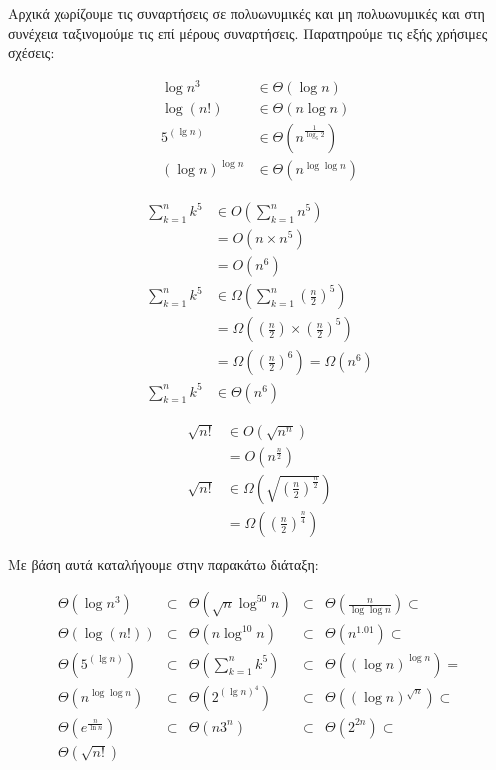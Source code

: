 \documentclass[11pt,a4paper]{book}
\begin{document}
Αρχικά χωρίζουμε τις συναρτήσεις σε πολυωνυμικές και μη πολυωνυμικές και στη συνέχεια ταξινομούμε τις επί μέρους συναρτήσεις. Παρατηρούμε τις εξής χρήσιμες σχέσεις:

\begin{align*}
\log n^3 &\in \Theta( \log n )\\
\log( n! ) &\in \Theta( n \log n )\\
5^{(\lg n)} &\in \Theta( n^{\frac{1}{\log_5 2}} )\\
(\log n)^{\log n} &\in \Theta( n^{\log \log n} )
\end{align*}

\begin{align*}
\sum_{k=1}^n k^5 &\in O\left( \sum_{k=1}^n n^5 \right)\\
&= O( n \times n^5 )\\
&= O( n^6 ) \\
\sum_{k=1}^n k^5 &\in \Omega\left( \sum_{k=1}^n \left(\frac{n}{2}\right)^5 \right)\\
&= \Omega\left( \left(\frac{n}{2}\right) \times \left(\frac{n}{2}\right)^5 \right)\\
&= \Omega\left( \left(\frac{n}{2}\right)^6 \right) = \Omega( n^6 ) \\
\sum_{k=1}^n k^5 &\in \Theta( n^6 )
\end{align*}

\begin{align*}
\sqrt{n!} &\in O( \sqrt{ n^n } )\\
&= O( n^{\frac{n}{2}} )\\
\sqrt{n!} &\in \Omega\left( \sqrt{ ( \frac{n}{2} )^{ \frac{n}{2} } } \right) \\
&= \Omega\left( \left(\frac{n}{2}\right)^{\frac{n}{4}} \right)
\end{align*}

Με βάση αυτά καταλήγουμε στην παρακάτω διάταξη:

\begin{align*}
\Theta( \log n^3 ) &\subset& \Theta( \sqrt n \log^{50} n ) &\subset& \Theta\left( \frac{n}{\log \log n} \right)\subset \\
\Theta(\log( n! )) &\subset& \Theta( n \log^{10} n ) &\subset& \Theta( n^{1.01} )\subset \\
\Theta( 5^{(\lg n)} ) &\subset& \Theta\left( \sum_{k=1}^n k^5 \right) &\subset& \Theta( (\log n)^{\log n} ) = \\
\Theta( n^{\log \log n} ) &\subset& \Theta( 2^{(\lg n)^4} ) &\subset& \Theta( (\log n)^{\sqrt n} ) \subset\\
\Theta( e^{\frac{n}{\ln n}} ) &\subset& \Theta( n {3^n} ) &\subset& \Theta( 2^{2n} ) \subset\\
\Theta( \sqrt{n!} )
\end{align*}
\end{document}

